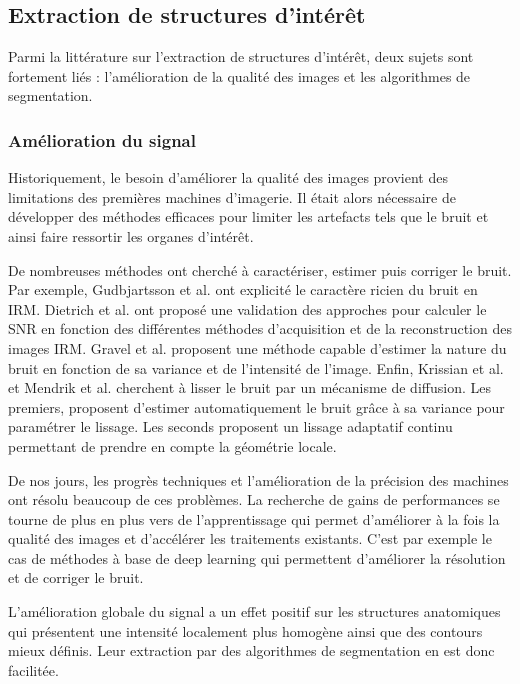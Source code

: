   \subsection{Extraction de structures d'intérêt}

      Parmi la littérature sur l'extraction de structures d'intérêt, deux sujets sont fortement liés : l'amélioration de la qualité des images et les algorithmes de segmentation.

    \subsubsection{Amélioration du signal}
      
    Historiquement, le besoin d'améliorer la qualité des images provient des limitations des premières machines d'imagerie. Il était alors nécessaire de développer des méthodes efficaces pour limiter les artefacts tels que le bruit et ainsi faire ressortir les organes d'intérêt. 
    
    De nombreuses méthodes ont cherché à caractériser, estimer puis corriger le bruit. Par exemple, Gudbjartsson et al. \cite{Gudbjartsson1995r_Rician_noise_MRI} ont explicité le caractère ricien du bruit en IRM. Dietrich et al. ont proposé une validation des approches pour calculer le SNR en fonction des différentes méthodes d'acquisition et de la reconstruction des images IRM. Gravel et al. \cite{Gravel_2004_estimate_noise_medical_img} proposent une méthode capable d'estimer la nature du bruit en fonction de sa variance et de l'intensité de l'image. Enfin, Krissian et al. \cite{Krissian_2009_diffusion_MRI} et Mendrik et al. \cite{Mendrik2009_HDCS} cherchent à lisser le bruit par un mécanisme de diffusion. Les premiers, proposent d'estimer automatiquement le bruit grâce à sa variance pour paramétrer le lissage. Les seconds proposent un lissage adaptatif continu permettant de prendre en compte la géométrie locale.    
    
    De nos jours, les progrès techniques et l'amélioration de la précision des machines ont résolu beaucoup de ces problèmes. La recherche de gains de performances se tourne de plus en plus vers de l'apprentissage qui permet d'améliorer à la fois la qualité des images et d'accélérer les traitements existants. C'est par exemple le cas de méthodes à base de deep learning \cite{Higaki2019_deep_MRI_CT_quality} qui permettent d'améliorer la résolution et de corriger le bruit.

    L'amélioration globale du signal a un effet positif sur les structures anatomiques qui présentent une intensité localement plus homogène ainsi que des contours mieux définis. Leur extraction par des algorithmes de segmentation en est donc facilitée.

